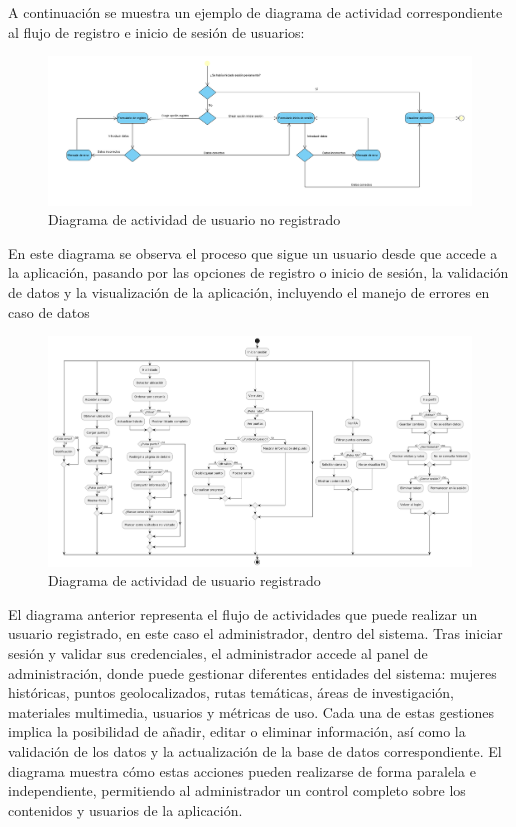 A continuación se muestra un ejemplo de diagrama de actividad correspondiente al flujo de registro e inicio de sesión de usuarios:

\begin{figure}[H]
    \centering
    \includegraphics[width=1\textwidth]{figs/diagrama_actividad_usuario_no_registrado.png}
    \caption{Diagrama de actividad de usuario no registrado}
\end{figure}

En este diagrama se observa el proceso que sigue un usuario desde que accede a la aplicación, pasando por las opciones de registro o inicio de sesión, la validación de datos y la visualización de la aplicación, incluyendo el manejo de errores en caso de datos

\begin{figure}[H]
    \centering
    \includegraphics[width=1\textwidth]{figs/diagrama_actividad_usuario_registrado.png}
    \caption{Diagrama de actividad de usuario registrado}
\end{figure}

El diagrama anterior representa el flujo de actividades que puede realizar un usuario registrado, en este caso el administrador, dentro del sistema. Tras iniciar sesión y validar sus credenciales, el administrador accede al panel de administración, donde puede gestionar diferentes entidades del sistema: mujeres históricas, puntos geolocalizados, rutas temáticas, áreas de investigación, materiales multimedia, usuarios y métricas de uso. Cada una de estas gestiones implica la posibilidad de añadir, editar o eliminar información, así como la validación de los datos y la actualización de la base de datos correspondiente. El diagrama muestra cómo estas acciones pueden realizarse de forma paralela e independiente, permitiendo al administrador un control completo sobre los contenidos y usuarios de la aplicación.
